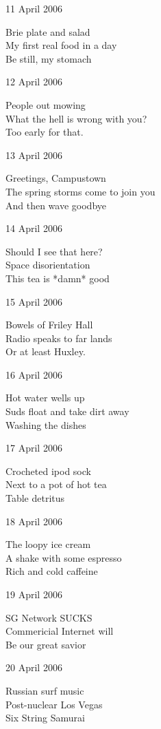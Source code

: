 \documentclass[12pt]{article}
\begin{document}
11 April 2006

Brie plate and salad \\
My first real food in a day \\
Be still, my stomach

12 April 2006

People out mowing \\
What the hell is wrong with you? \\
Too early for that.


\newpage

13 April 2006

Greetings, Campustown \\
The spring storms come to join you \\
And then wave goodbye

14 April 2006

Should I see that here? \\
Space disorientation \\
This tea is *damn* good

15 April 2006

Bowels of Friley Hall \\
Radio speaks to far lands \\
Or at least Huxley. 

16 April 2006

Hot water wells up \\
Suds float and take dirt away \\
Washing the dishes

17 April 2006

Crocheted ipod sock \\
Next to a pot of hot tea \\
Table detritus

18 April 2006

The loopy ice cream \\
A shake with some espresso  \\
Rich and cold caffeine


\newpage

19 April 2006

SG Network SUCKS \\
Commericial Internet will \\
Be our great savior

20 April 2006
 
Russian surf music \\
Post-nuclear Los Vegas \\
Six String Samurai
\end{document}
